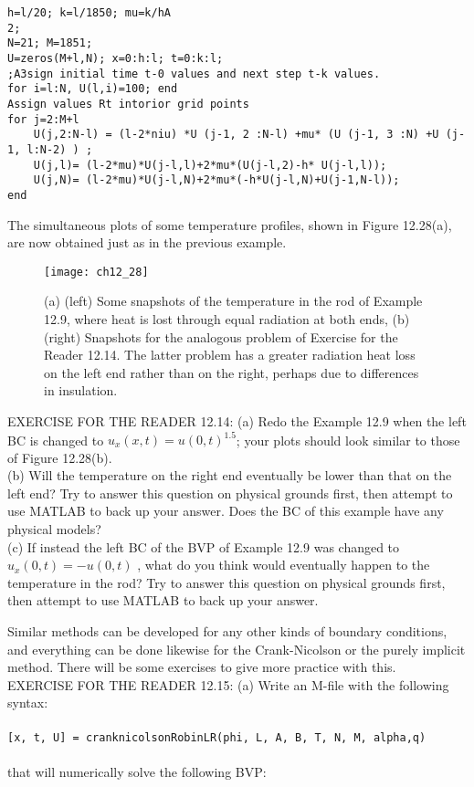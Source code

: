 \documentclass[../main.tex]{subfiles}
\begin{document}
\begin{lstlisting}[numbers=none,frame=none]
h=l/20; k=l/1850; mu=k/hA
2; 
N=21; M=1851; 
U=zeros(M+l,N); x=0:h:l; t=0:k:l; 
;A3sign initial time t-0 values and next step t-k values. 
for i=l:N, U(l,i)=100; end 
Assign values Rt intorior grid points 
for j=2:M+l 
	U(j,2:N-l) = (l-2*niu) *U (j-1, 2 :N-l) +mu* (U (j-1, 3 :N) +U (j-1, l:N-2) ) ; 
	U(j,l)= (l-2*mu)*U(j-l,l)+2*mu*(U(j-l,2)-h* U(j-l,l)); 
	U(j,N)= (l-2*mu)*U(j-l,N)+2*mu*(-h*U(j-l,N)+U(j-1,N-l)); 
end 
\end{lstlisting}
The simultaneous plots of some temperature profiles, shown in Figure 12.28(a), 
are now obtained just as in the previous example.

\begin{figure}[H]
	\centering
	\texttt{[image: ch12\_28]}
	\caption{\textsf{(a) (left) Some snapshots of the temperature in the rod of Example 12.9, where heat is lost through equal radiation at both ends, (b) (right) Snapshots for the analogous problem of Exercise for the Reader 12.14. The latter problem has a greater radiation heat loss on the left end rather than on the right, perhaps due to differences in insulation. }}
	\label{pfig:ch12_28}
\end{figure}
EXERCISE FOR THE READER 12.14: (a) Redo the Example 12.9 when the left BC is changed to $u_x(x,t)=u(0,t)^{1.5}$; your plots should look similar to those of Figure 12.28(b). 
\\
(b) Will the temperature on the right end eventually be lower than that on the left end? Try to answer this question on physical grounds first, then attempt to use MATLAB to back up your answer. Does the BC of this example have any physical models? 
\\
(c) If instead the left BC of the BVP of Example 12.9 was changed to $u_x(0,t)=-u(0,t)$ , what do you think would eventually happen to the temperature in the rod? Try to answer this question on physical grounds first, then attempt to use MATLAB to back up your answer. 


Similar methods can be developed for any other kinds of boundary conditions, 
and everything can be done likewise for the Crank-Nicolson or the purely implicit 
method. There will be some exercises to give more practice with this. 
\\
EXERCISE FOR THE READER 12.15: (a) Write an M-file with the following 
syntax: 
\\
\\
\texttt{[x, t, U] = cranknicolsonRobinLR(phi, L, A, B, T, N, M, alpha,q)}
\\
\\
that will numerically solve the following BVP: 
\end{document}
